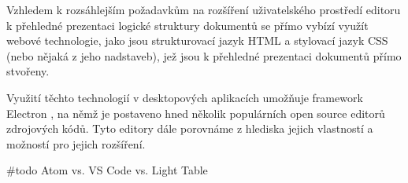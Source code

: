 Vzhledem k rozsáhlejším požadavkům na rozšíření uživatelského prostředí editoru k přehledné prezentaci logické struktury
dokumentů se přímo vybízí využít webové technologie, jako jsou strukturovací jazyk HTML a stylovací jazyk CSS (nebo
nějaká z jeho nadstaveb), jež jsou k přehledné prezentaci dokumentů přímo stvořeny. \cite{w3-html-css}

Využití těchto technologií v desktopových aplikacích umožňuje framework Electron \cite{electron-readme}, na němž je
postaveno hned několik populárních open source editorů zdrojových kódů. Tyto editory dále porovnáme z hlediska jejich
vlastností a možností pro jejich rozšíření.

\#todo Atom vs. VS Code vs. Light Table
